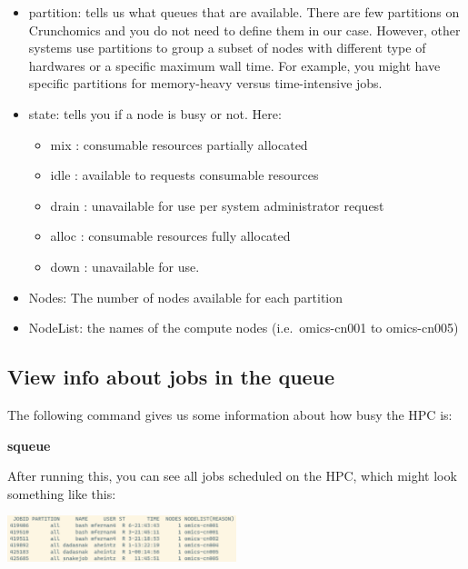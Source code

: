 \documentclass[
  letterpaper,
  DIV=11,
  numbers=noendperiod]{scrreprt}
\newenvironment{Shaded}{}{}
\newcommand{\ExtensionTok}[1]{\textcolor[rgb]{0.84,0.23,0.29}{\textbf{#1}}}
\providecommand{\tightlist}{%
  \setlength{\itemsep}{0pt}\setlength{\parskip}{0pt}}\usepackage{longtable,booktabs,array}
\begin{document}
\begin{itemize}
\tightlist
\item
  partition: tells us what queues that are available. There are few
  partitions on Crunchomics and you do not need to define them in our
  case. However, other systems use partitions to group a subset of nodes
  with different type of hardwares or a specific maximum wall time. For
  example, you might have specific partitions for memory-heavy versus
  time-intensive jobs.
\item
  state: tells you if a node is busy or not. Here:

  \begin{itemize}
  \tightlist
  \item
    mix : consumable resources partially allocated
  \item
    idle : available to requests consumable resources
  \item
    drain : unavailable for use per system administrator request
  \item
    alloc : consumable resources fully allocated
  \item
    down : unavailable for use.
  \end{itemize}
\item
  Nodes: The number of nodes available for each partition
\item
  NodeList: the names of the compute nodes (i.e.~omics-cn001 to
  omics-cn005)
\end{itemize}

\subsection{View info about jobs in the
queue}\label{view-info-about-jobs-in-the-queue}

The following command gives us some information about how busy the HPC
is:

\begin{Shaded}
\begin{Highlighting}[]
\ExtensionTok{squeue}
\end{Highlighting}
\end{Shaded}

After running this, you can see all jobs scheduled on the HPC, which
might look something like this:

\begin{center}
\includegraphics[width=0.5\textwidth,height=\textheight]{../img/squeue.png}
\end{center}
\end{document}
